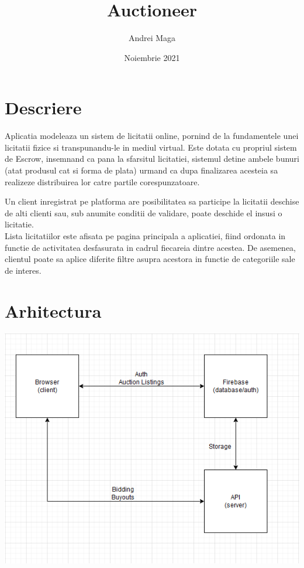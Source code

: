 \documentclass[12pt]{article}
\title{Auctioneer}
\author{Andrei Maga}
\date{Noiembrie 2021}
\begin{document}
	\begin{titlepage}
		
		\maketitle
	\end{titlepage}
	\pagebreak
	
	\section{Descriere}
	Aplicatia modeleaza un sistem de licitatii online, pornind de la fundamentele unei licitatii fizice si transpunandu-le in mediul virtual. Este dotata cu propriul sistem de Escrow, insemnand ca pana la sfarsitul licitatiei, sistemul detine ambele bunuri (atat produsul cat si forma de plata) urmand ca dupa finalizarea acesteia sa realizeze distribuirea lor catre partile corespunzatoare.
	
	Un client inregistrat pe platforma are posibilitatea sa participe la licitatii deschise de alti clienti sau, sub anumite conditii de validare, poate deschide el insusi o licitatie.\\
	Lista licitatiilor este afisata pe pagina principala a aplicatiei, fiind ordonata in functie de activitatea desfasurata in cadrul fiecareia dintre acestea.
	De asemenea, clientul poate sa aplice diferite filtre asupra acestora in functie de categoriile sale de interes.

	\pagebreak

	\section{Arhitectura}
	\includegraphics{archi}
\end{document}
